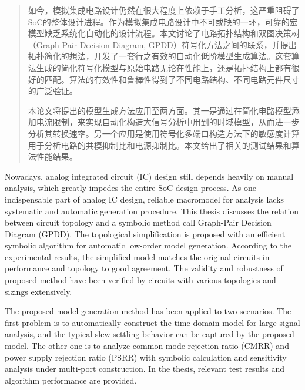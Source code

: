 
\begin{abstract}

如今，模拟集成电路设计仍然在很大程度上依赖于手工分析，这严重阻碍了SoC的整体设计进程。作为模拟集成电路设计中不可或缺的一环，可靠的宏模型缺乏系统化自动化的设计流程。本文讨论了电路拓扑结构和双图决策树（Graph Pair Decision Diagram, GPDD）符号化方法之间的联系，并提出拓扑简化的想法，开发了一套行之有效的自动化低阶模型生成算法。这套算法生成的简化符号化模型与原始电路无论在性能上，还是拓扑结构上都有很好的匹配。算法的有效性和鲁棒性得到了不同电路结构、不同电路元件尺寸的广泛验证。

本论文将提出的模型生成方法应用至两方面。其一是通过在简化电路模型添加电流限制，来实现自动化构造大信号分析中用到的时域模型，从而进一步分析其转换速率。另一个应用是使用符号化多端口构造方法下的敏感度计算用于分析电路的共模抑制比和电源抑制比。本文给出了相关的测试结果和算法性能结果。

\end{abstract}

\begin{englishabstract}

Nowadays, analog integrated circuit (IC) design still depends heavily on manual analysis, which greatly impedes the entire SoC design process. As one indispensable part of analog IC design, reliable macromodel for analysis lacks systematic and automatic generation procedure. This thesis discusses the relation between circuit topology and a symbolic method call Graph-Pair Decision Diagram (GPDD). The topological simplification is proposed with an efficient symbolic algorithm for automatic low-order model generation. According to the experimental results, the simplified model matches the original circuits in performance and topology to good agreement. The validity and robustness of proposed method have been verified by circuits with various topologies and sizings extensively.

The proposed model generation method has been applied to two scenarios. The first problem is to automatically construct the time-domain model for large-signal analysis, and the typical slew-settling behavior can be captured by the proposed model. The other one is to analyze common mode rejection ratio (CMRR) and power supply rejection ratio (PSRR) with symbolic calculation and sensitivity analysis under multi-port construction. In the thesis, relevant test results and algorithm performance are provided.


\end{englishabstract}

